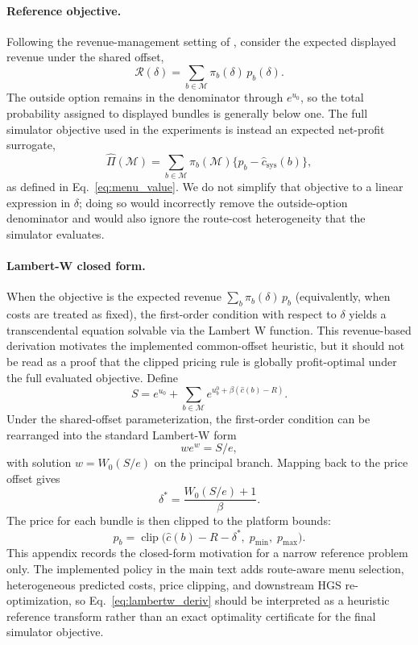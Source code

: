 \paragraph{Reference objective.} Following the revenue-management setting of \citet{talluri2004revenue}, consider the expected displayed revenue under the shared offset,
\[
  \mathcal{R}(\delta) = \sum_{b \in \mathcal{M}} \pi_b(\delta)\,p_b(\delta).
\]
The outside option remains in the denominator through $e^{u_0}$, so the total probability assigned to displayed bundles is generally below one. The full simulator objective used in the experiments is instead an expected net-profit surrogate,
\[
  \widehat{\Pi}(\mathcal{M}) = \sum_{b \in \mathcal{M}} \pi_b(\mathcal{M})\{p_b-\hat c_{\mathrm{sys}}(b)\},
\]
as defined in Eq.~\ref{eq:menu_value}. We do not simplify that objective to a linear expression in $\delta$; doing so would incorrectly remove the outside-option denominator and would also ignore the route-cost heterogeneity that the simulator evaluates.

\paragraph{Lambert-W closed form.} When the objective is the expected revenue
$\sum_b \pi_b(\delta)\,p_b$ (equivalently, when costs are treated as fixed), the
first-order condition with respect to $\delta$ yields a transcendental equation
solvable via the Lambert W function. This revenue-based derivation motivates the implemented common-offset heuristic, but it should not be read as a proof that the clipped pricing rule is globally profit-optimal under the full evaluated objective. Define
\[
  S = e^{u_0} + \sum_{b \in \mathcal{M}} e^{u_b^0 + \beta(\hat{c}(b) - R)}.
\]
Under the shared-offset parameterization, the first-order condition can be rearranged into the standard Lambert-W form
\[
  w e^w = S/e,
\]
with solution $w = W_0(S/e)$ on the principal branch. Mapping back to the price offset gives
\begin{equation}
  \delta^* = \frac{W_0(S/e) + 1}{\beta}.
  \tag{A.1}\label{eq:lambertw_deriv}
\end{equation}
The price for each bundle is then clipped to the platform bounds:
\[
  p_b = \operatorname{clip}\!\bigl(\hat{c}(b) - R - \delta^*,\; p_{\min},\; p_{\max}\bigr).
\]
This appendix records the closed-form motivation for a narrow reference problem only. The implemented policy in the main text adds route-aware menu selection, heterogeneous predicted costs, price clipping, and downstream HGS re-optimization, so Eq.~\eqref{eq:lambertw_deriv} should be interpreted as a heuristic reference transform rather than an exact optimality certificate for the final simulator objective.

